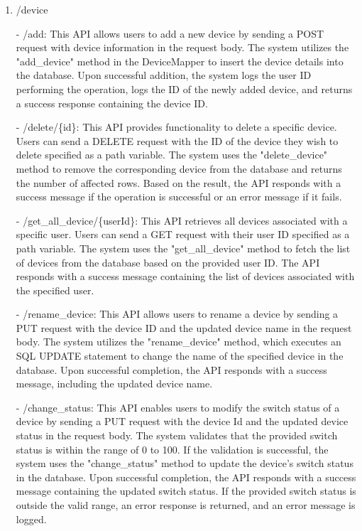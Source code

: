 \begin{enumerate}
                        \item /device
                        \item[-] /add: This API allows users to add a new device by sending a POST request with device information in the request body. The system utilizes the "add\_device" method in the DeviceMapper to insert the device details into the database. Upon successful addition, the system logs the user ID performing the operation, logs the ID of the newly added device, and returns a success response containing the device ID.\\
                        \item[-] /delete/\{id\}: This API provides functionality to delete a specific device. Users can send a DELETE request with the ID of the device they wish to delete specified as a path variable. The system uses the "delete\_device" method to remove the corresponding device from the database and returns the number of affected rows. Based on the result, the API responds with a success message if the operation is successful or an error message if it fails.\\
                        \item[-] /get\_all\_device/\{userId\}: This API retrieves all devices associated with a specific user. Users can send a GET request with their user ID specified as a path variable. The system uses the "get\_all\_device" method to fetch the list of devices from the database based on the provided user ID. The API responds with a success message containing the list of devices associated with the specified user.\\
                        \item[-] /rename\_device: This API allows users to rename a device by sending a PUT request with the device ID and the updated device name in the request body. The system utilizes the "rename\_device" method, which executes an SQL UPDATE statement to change the name of the specified device in the database. Upon successful completion, the API responds with a success message, including the updated device name.\\
                        \item[-] /change\_status: This API enables users to modify the switch status of a device by sending a PUT request with the device Id and the updated device status in the request body. The system validates that the provided switch status is within the range of 0 to 100. If the validation is successful, the system uses the "change\_status" method to update the device's switch status in the database. Upon successful completion, the API responds with a success message containing the updated switch status. If the provided switch status is outside the valid range, an error response is returned, and an error message is logged.\\


\end{enumerate}
